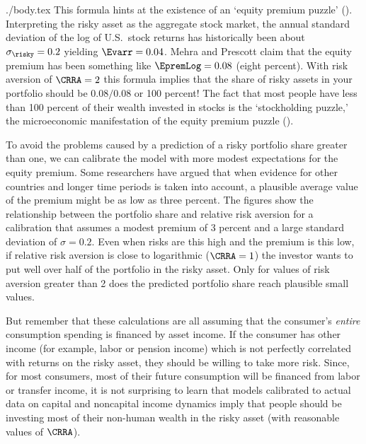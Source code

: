 \documentclass{\handout}
\begin{document}
\begin{verbatimwrite}{./body.tex}
This formula hints at the existence of an `equity premium puzzle'
(\cite{mehraPrescottPuzzle}).  Interpreting the risky asset as the
aggregate stock market, the annual standard deviation of the log of
U.S.\ stock returns has historically been about $\sigma_{\risky}=0.2$
yielding $\Evarr = 0.04$.  Mehra and Prescott claim that the equity premium
has been something like $\EpremLog = 0.08$ (eight percent).  With risk
aversion of $\CRRA=2$ this formula implies that the share of risky
assets in your portfolio should be $0.08/0.08$ or 100 percent!  The
fact that most people have less than 100 percent of their wealth
invested in stocks is the `stockholding puzzle,' the microeconomic
manifestation of the equity premium puzzle
(\cite{haliassos&bertaut:fewholdstocks}).

To avoid the problems caused by a prediction of a risky portfolio
share greater than one, we can calibrate the model with more modest
expectations for the equity premium.  Some researchers have argued
that when evidence for other countries and longer time periods is
taken into account, a plausible average value of the premium might be
as low as three percent.  The figures show the relationship
between the portfolio share and relative risk aversion for a
calibration that assumes a modest premium of 3 percent and a large
standard deviation of $\sigma=0.2$.  Even when risks are this high and
the premium is this low, if relative risk aversion is close to
logarithmic ($\CRRA = 1$) the investor wants to put well over half of
the portfolio in the risky asset.  Only for values of risk aversion
greater than 2 does the predicted portfolio share reach plausible
small values.

But remember that these calculations are all assuming that the consumer's \textit{entire} consumption spending is financed by asset income.  If the consumer has other income (for example, labor or pension income) which is not perfectly correlated with returns on the risky asset, they should be willing to take more risk.  Since, for most consumers, most of their future consumption will be financed from labor or transfer income, it is not surprising to learn that models calibrated to actual data on capital and noncapital income dynamics imply that people should be investing most of their non-human wealth in the risky asset (with reasonable values of $\CRRA$).



\end{verbatimwrite}
\end{document}
